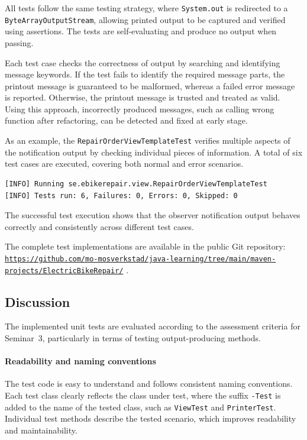\documentclass[a4paper]{scrartcl}
\begin{document}
All tests follow the same testing strategy, where \texttt{System.out} is redirected to a \texttt{ByteArrayOutputStream}, allowing printed output to be captured and verified using assertions. The tests are self-evaluating and produce no output when passing.

Each test case checks the correctness of output by searching and identifying message keywords. If the test fails to identify the required message parts, the printout message is guaranteed to be malformed, whereas a failed error message is reported. Otherwise, the printout message is trusted and treated as valid. Using this approach, incorrectly produced messages, such as calling wrong function after refactoring, can be detected and fixed at early stage.

As an example, the \texttt{RepairOrderViewTemplateTest} verifies multiple aspects of the notification output by checking individual pieces of information. A total of six test cases are executed, covering both normal and error scenarios.

\begin{lstlisting}[style=outputstyle, caption={Example JUnit test execution result}]
[INFO] Running se.ebikerepair.view.RepairOrderViewTemplateTest
[INFO] Tests run: 6, Failures: 0, Errors: 0, Skipped: 0
\end{lstlisting}

The successful test execution shows that the observer notification output behaves correctly and consistently across different test cases.

The complete test implementations are available in the public Git repository:
\href{https://github.com/mo-mosverkstad/java-learning/tree/main/maven-projects/ElectricBikeRepair/}{\nolinkurl{https://github.com/mo-mosverkstad/java-learning/tree/main/maven-projects/ElectricBikeRepair/}} \cite{sourcecode}.



\subsection{Discussion}

The implemented unit tests are evaluated according to the assessment criteria for Seminar~3, particularly in terms of testing output-producing methods.

\paragraph{Readability and naming conventions}
The test code is easy to understand and follows consistent naming conventions. Each test class clearly reflects the class under test, where the suffix \texttt{-Test} is added to the name of the tested class, such as \texttt{ViewTest} and \texttt{PrinterTest}. Individual test methods describe the tested scenario, which improves readability and maintainability.
\end{document}

